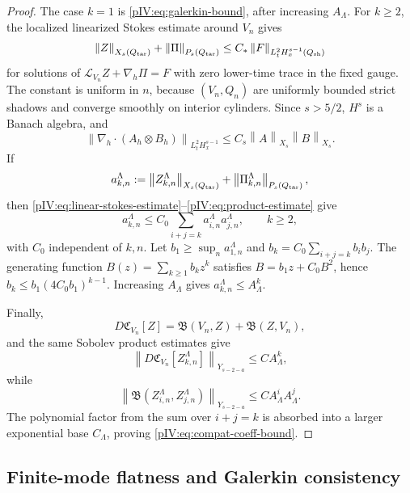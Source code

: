 \documentclass[11pt]{article}
\numberwithin{equation}{section}
\theoremstyle{plain}
\theoremstyle{definition}
\theoremstyle{remark}
\newcommand{\nabh}{\nabla_h}
\newcommand{\norm}[2]{\left\|#1\right\|_{#2}}
\newcommand{\calB}{\mathfrak B}
\newcommand{\calC}{\mathfrak C}
\begin{document}
\begin{proof}
The case \(k=1\) is \eqref{pIV:eq:galerkin-bound}, after increasing \(A_\Lambda\).  For
\(k\ge2\), the localized linearized Stokes estimate around \(V_n\) gives
\begin{equation}\label{pIV:eq:linear-stokes-estimate}
        \norm{Z}{X_s(Q_{\rm tar})}+\norm{\Pi}{P_s(Q_{\rm tar})}
        \le C_*
        \norm{F}{L^2_tH^{s-1}_x(Q_{\rm sh})}
\end{equation}
for solutions of
\(\mathcal L_{V_n}Z+\nabh\Pi=F\) with zero lower-time trace in the fixed gauge.  The
constant is uniform in \(n\), because \((V_n,Q_n)\) are uniformly bounded strict
shadows and converge smoothly on interior cylinders.  Since \(s>5/2\), \(H^s\) is a
Banach algebra, and
\begin{equation}\label{pIV:eq:product-estimate}
        \norm{\nabh\cdot(A_h\otimes B_h)}{L^2_tH^{s-1}_x}
        \le C_s\norm{A}{X_s}\norm{B}{X_s}.
\end{equation}
If
\[
        a_{k,n}^\Lambda:=
        \norm{Z_{k,n}^\Lambda}{X_s(Q_{\rm tar})}
        +\norm{\Pi_{k,n}^\Lambda}{P_s(Q_{\rm tar})},
\]
then \eqref{pIV:eq:linear-stokes-estimate}--\eqref{pIV:eq:product-estimate} give
\begin{equation}\label{pIV:eq:catalan-recursion}
        a_{k,n}^\Lambda
        \le C_0\sum_{i+j=k}a_{i,n}^\Lambda a_{j,n}^\Lambda,
        \qquad k\ge2,
\end{equation}
with \(C_0\) independent of \(k,n\).  Let \(b_1\ge\sup_n a_{1,n}^\Lambda\) and
\(b_k=C_0\sum_{i+j=k}b_ib_j\).  The generating function
\(B(z)=\sum_{k\ge1}b_kz^k\) satisfies \(B=b_1z+C_0B^2\), hence
\(b_k\le b_1(4C_0b_1)^{k-1}\).  Increasing \(A_\Lambda\) gives
\(a_{k,n}^\Lambda\le A_\Lambda^k\).

Finally,
\[
        D\calC_{V_n}[Z]=\calB(V_n,Z)+\calB(Z,V_n),
\]
and the same Sobolev product estimates give
\[
        \norm{D\calC_{V_n}[Z_{k,n}^\Lambda]}{Y_{s-2-a}}
        \le C A_\Lambda^k,
\]
while
\[
        \norm{\calB(Z_{i,n}^\Lambda,Z_{j,n}^\Lambda)}{Y_{s-2-a}}
        \le C A_\Lambda^iA_\Lambda^j.
\]
The polynomial factor from the sum over \(i+j=k\) is absorbed into a larger
exponential base \(C_\Lambda\), proving \eqref{pIV:eq:compat-coeff-bound}.
\end{proof}

\subsection{Finite-mode flatness and Galerkin consistency}\label{pIV:sec:flatness}
\end{document}
